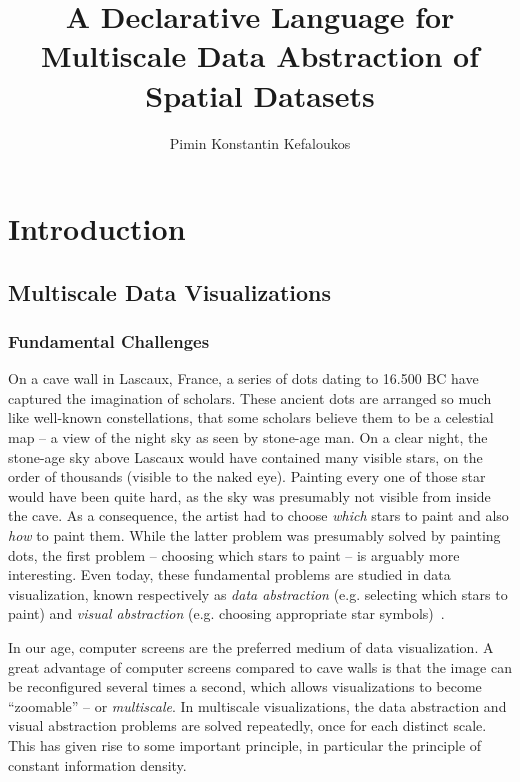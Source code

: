 \documentclass[11pt, oneside]{report}   	%
\title{A Declarative Language for Multiscale Data Abstraction of Spatial Datasets}
\author{Pimin Konstantin Kefaloukos}
\begin{document}
\maketitle

\tableofcontents

\part{Introduction}

\chapter{Multiscale Data Visualizations}

\section{Fundamental Challenges}
On a cave wall in Lascaux, France, a series of dots dating to 16.500 BC have captured the imagination of scholars. These ancient dots are arranged so much like well-known constellations, that some scholars believe them to be a celestial map -- a view of the night sky as seen by stone-age man. On a clear night, the stone-age sky above Lascaux would have contained many visible stars, on the order of thousands (visible to the naked eye). Painting every one of those star would have been quite hard, as the sky was presumably not visible from inside the cave. As a consequence, the artist had to choose \emph{which} stars to paint and also \emph{how} to paint them. While the latter problem was presumably solved by painting dots, the first problem -- choosing which stars to paint -- is arguably more interesting. Even today, these fundamental problems are studied in data visualization, known respectively as \emph{data abstraction} (e.g. selecting which stars to paint) and \emph{visual abstraction} (e.g. choosing appropriate star symbols)~\cite{stolte2003multiscale}.

In our age, computer screens are the preferred medium of data visualization. A great advantage of computer screens compared to cave walls is that the image can be reconfigured several times a second, which allows visualizations to become ``zoomable'' -- or \emph{multiscale}. In multiscale visualizations, the data abstraction and visual abstraction problems are solved repeatedly, once for each distinct scale. This has given rise to some important principle, in particular the principle of constant information density.
\end{document}
